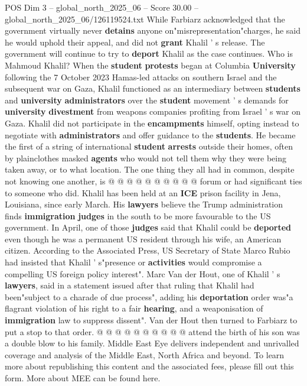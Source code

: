 \begin{textsample}{POS Dim 3 – global\_north\_2025\_06 – Score 30.00 – global\_north\_2025\_06/126119524.txt}
While Farbiarz acknowledged that the government virtually never \textbf{detains} anyone on"misrepresentation"charges, he said he would uphold their appeal, and did not \textbf{grant} Khalil ' s release.
The government will continue to try to \textbf{deport} Khalil as the case continues.
Who is Mahmoud Khalil?
When the \textbf{student} \textbf{protests} began at Columbia \textbf{University} following the 7 October 2023 Hamas-led attacks on southern Israel and the subsequent war on Gaza, Khalil functioned as an intermediary between \textbf{students} and \textbf{university} \textbf{administrators} over the \textbf{student} movement ' s demands for \textbf{university} \textbf{divestment} from weapons companies profiting from Israel ' s war on Gaza.
Khalil did not participate in the \textbf{encampments} himself, opting instead to negotiate with \textbf{administrators} and offer guidance to the \textbf{students}.
He became the first of a string of international \textbf{student} \textbf{arrests} outside their homes, often by plainclothes masked \textbf{agents} who would not tell them why they were being taken away, or to what location.
The one thing they all had in common, despite not knowing one another, is @ @ @ @ @ @ @ @ @ @ forum or had significant ties to someone who did.
Khalil has been held at an \textbf{ICE} prison facility in Jena, Louisiana, since early March.
His \textbf{lawyers} believe the Trump administration finds \textbf{immigration} \textbf{judges} in the south to be more favourable to the US government.
In April, one of those \textbf{judges} said that Khalil could be \textbf{deported} even though he was a permanent US resident through his wife, an American citizen.
According to the Associated Press, US Secretary of State Marco Rubio had insisted that Khalil ' s"presence or \textbf{activities} would compromise a compelling US foreign policy interest".
Marc Van der Hout, one of Khalil ' s \textbf{lawyers}, said in a statement issued after that ruling that Khalil had been"subject to a charade of due process", adding his \textbf{deportation} order was"a flagrant violation of his right to a fair \textbf{hearing}, and a weaponisation of \textbf{immigration} law to suppress dissent".
Van der Hout then turned to Farbiarz to put a stop to that order. @ @ @ @ @ @ @ @ @ @ attend the birth of his son was a double blow to his family.
Middle East Eye delivers independent and unrivalled coverage and analysis of the Middle East, North Africa and beyond.
To learn more about republishing this content and the associated fees, please fill out this form.
More about MEE can be found here.

\end{textsample}
